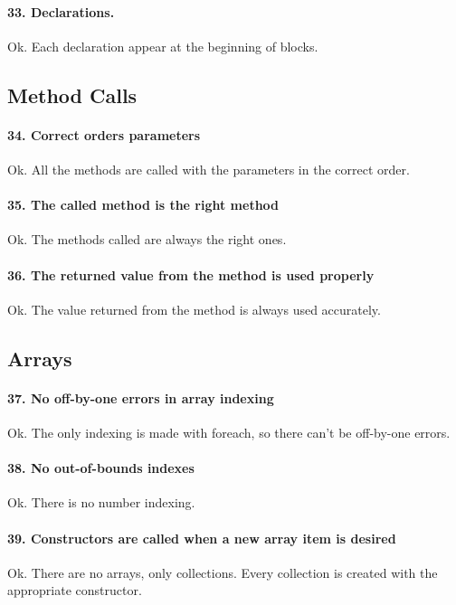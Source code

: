 \documentclass[english]{article}
\begin{document}
\paragraph{33. Declarations.} Ok. Each declaration appear at the beginning of blocks.

\subsection{Method Calls}

\paragraph{34. Correct orders parameters}

Ok. All the methods are called with the parameters in the correct order.

\paragraph{35. The called method is the right method}

Ok. The methods called are always the right ones.

\paragraph{36. The returned value from the method is used properly}

Ok. The value returned from the method is always used accurately.


\subsection{Arrays}
\paragraph{37. No off-by-one errors in array indexing}
Ok.
The only indexing is made with foreach, so there can't be off-by-one errors.

\paragraph{38. No out-of-bounds indexes}
Ok.
There is no number indexing.

\paragraph{39. Constructors are called when a new array item is desired}
Ok.
There are no arrays, only collections. Every collection is created with the appropriate constructor.
\end{document}
